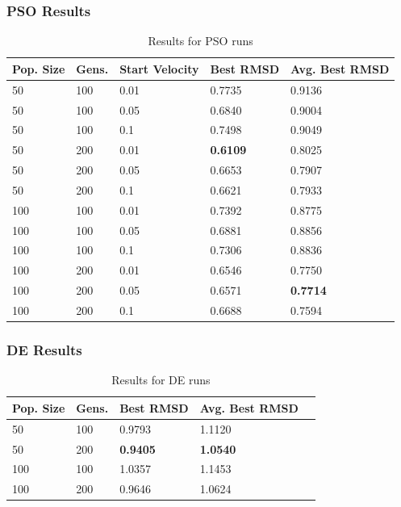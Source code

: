 \documentclass[10pt]{beamer}
\begin{document}
\begin{frame}
	\frametitle{PSO Results}

	\begin{table}
		\centering
		\begin{tabular}{ | l | l | l | l | l | }
		  \hline
			Pop. Size & Gens. & Start Velocity & Best RMSD & Avg. Best RMSD \\ \hline \hline
			50 & 100 & 0.01 & 0.7735 & 0.9136 \\ \hline
			50 & 100 & 0.05 & 0.6840 & 0.9004 \\ \hline
			50 & 100 & 0.1 & 0.7498 & 0.9049 \\ \hline
			50 & 200 & 0.01 & \textbf{0.6109} & 0.8025 \\ \hline
			50 & 200 & 0.05 & 0.6653 & 0.7907 \\ \hline
			50 & 200 & 0.1 & 0.6621 & 0.7933 \\ \hline
			100 & 100 & 0.01 & 0.7392 & 0.8775 \\ \hline
			100 & 100 & 0.05 & 0.6881 & 0.8856 \\ \hline
			100 & 100 & 0.1 & 0.7306 & 0.8836 \\ \hline
			100 & 200 & 0.01 & 0.6546 & 0.7750 \\ \hline
			100 & 200 & 0.05 & 0.6571 & \textbf{0.7714} \\ \hline
			100 & 200 & 0.1 & 0.6688 & 0.7594 \\ \hline
		\end{tabular}
		\caption{Results for PSO runs}
	\end{table}

\end{frame}

\begin{frame}
	\frametitle{DE Results}

	\begin{table}
		\centering
		\begin{tabular}{ | l | l | l | l | l | }
		  \hline
			Pop. Size & Gens. & Best RMSD & Avg. Best RMSD \\ \hline \hline
			50 & 100 & 0.9793 & 1.1120 \\ \hline
			50 & 200 & \textbf{0.9405} & \textbf{1.0540} \\ \hline
			100 & 100 & 1.0357 & 1.1453 \\ \hline
			100 & 200 & 0.9646 & 1.0624 \\ \hline
		\end{tabular}
		\caption{Results for DE runs}
	\end{table}

\end{frame}
\end{document}
